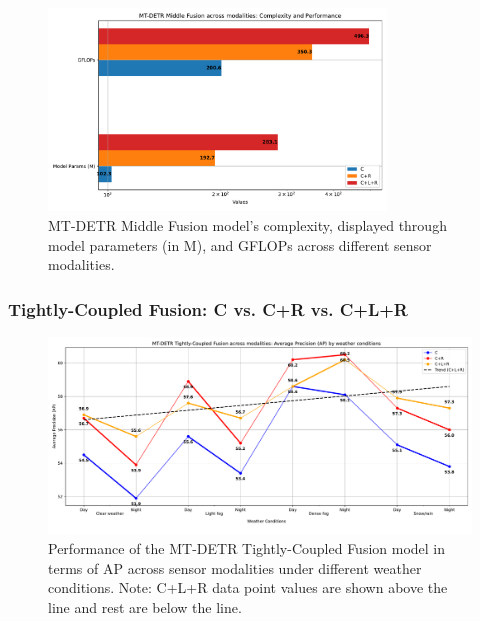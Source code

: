 \documentclass[report.tex]{subfiles}
\begin{document}
    \begin{figure}[h!]
        \centering
        \includegraphics[width=0.8\textwidth]{images/results/mtdetr/middle/model_complexity.pdf}
        \caption{MT-DETR Middle Fusion model's complexity, displayed through model parameters (in M), and GFLOPs across different sensor modalities.}
        \label{fig:mtdetr_middle_model_complexity}
    \end{figure}

    \FloatBarrier
    \subsubsection{Tightly-Coupled Fusion: C vs. C+R vs. C+L+R}

    \begin{figure}[h!]
        \centering
        \includegraphics[width=1.0\textwidth]{images/results/mtdetr/tight/ap.pdf}
        \caption{Performance of the MT-DETR Tightly-Coupled Fusion model in terms of AP across sensor modalities under different weather conditions. Note: C+L+R data point values are shown above the line and rest are below the line.}
        \label{fig:mtdetr_tight_ap}
    \end{figure}
\end{document}
